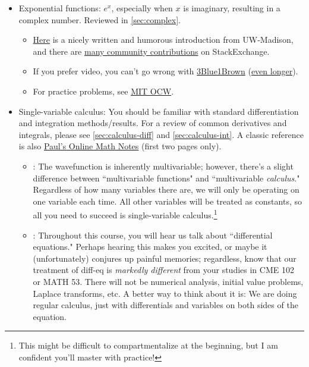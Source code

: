 \begin{itemize}
	\item Exponential functions: $e^x$, especially when $x$ is imaginary, resulting in a complex number.
	Reviewed in \autoref{sec:complex}.
	
	\begin{itemize}
		\item \href{https://people.math.wisc.edu/~angenent/Free-Lecture-Notes/freecomplexnumbers.pdf}{Here} is a nicely written and humorous introduction from UW-Madison, and there are \href{https://physics.stackexchange.com/questions/307492/significance-of-complex-exponential-representation-of-waves}{many community contributions} on StackExchange.
		
		\item If you prefer video, you can't go wrong with \href{https://www.youtube.com/watch?v=v0YEaeIClKY\&list=PLZHQObOWTQDNPOjrT6KVlfJuKtYTftqH6}{3Blue1Brown} (\href{https://www.youtube.com/watch?v=5PcpBw5Hbwo\&list=PLZHQObOWTQDP5CVelJJ1bNDouqrAhVPev}{even longer}).
		
		\item For practice problems, see \href{https://ocw.mit.edu/courses/18-03sc-differential-equations-fall-2011/pages/unit-i-first-order-differential-equations/complex-arithmetic-and-exponentials/}{MIT OCW}.
	\end{itemize}
	
	\item Single-variable calculus: You should be familiar with standard differentiation and integration methods/results. 
	For a review of common derivatives and integrals, please see \autoref{sec:calculus-diff} and \ref{sec:calculus-int}.
	A classic reference is also  \href{https://tutorial.math.lamar.edu/pdf/common_derivatives_integrals.pdf}{Paul's Online Math Notes} (first two pages only).
	
	\begin{itemize}
		\item {}: The wavefunction is inherently multivariable; however, there's a slight difference between ``multivariable functions" and ``multivariable \emph{calculus}."
		Regardless of how many variables there are, we will only be operating on one variable each time.
		All other variables will be treated as constants, so all you need to succeed is single-variable calculus.\footnote{This might be difficult to compartmentalize at the beginning, but I am confident you'll master with practice!}
		
		\item {}: Throughout this course, you will hear us talk about ``differential equations."
		Perhaps hearing this makes you excited, or maybe it {\tiny(unfortunately)} conjures up painful memories; regardless, know that our treatment of diff-eq is \emph{markedly different} from your studies in CME 102 or MATH 53. 
		There will not be numerical analysis, initial value problems, Laplace transforms, etc.
		A better way to think about it is: We are doing regular calculus, just with differentials and variables on both sides of the equation.
	\end{itemize}
	

\end{itemize}
